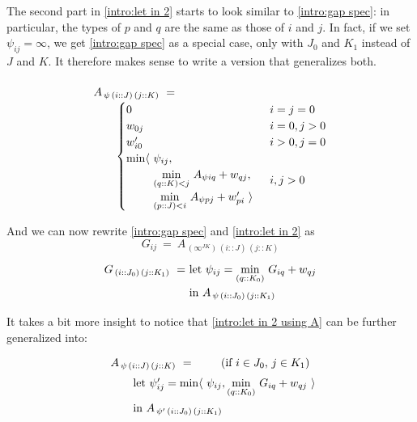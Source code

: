 \medskip
The second part in \eqref{intro:let in 2} starts to look similar to \eqref{intro:gap spec}:
in particular, the types of $p$ and $q$ are the same as those of $i$ and $j$.
In fact, if we set $\psi_{ij}=\infty$, we get \eqref{intro:gap spec} as a special case,
only with $J_0$ and $K_1$ instead of $J$ and $K$.
It therefore makes sense to write a version that generalizes both.

\begin{equation}\LeftEqNo
\renewcommand\arraystretch{1.5}
\begin{array}{l}
	A_{\,\psi\, (i :: J)\, (j :: K)} ~=~  \\
	\qquad
	\begin{cases}
		0                        & i=j=0 \\
		w_{0j}                   & i=0, j>0 \\
		w'_{i0}                  & i>0, j=0 \\
		\begin{array}{@{}l@{~}l}
		  \min\langle & \psi_{ij}, \\
		              & \underset{(q::K)<j}\min ~ A_{\psi iq} + w_{qj}, \\
		              & \underset{(p::J)<i}\min ~ A_{\psi pj} + w'_{pi}~\rangle
		\end{array}              & i,j>0
	\end{cases}
\end{array}
\label{intro:gap phase A}
\end{equation}

\medskip
And we can now rewrite \eqref{intro:gap spec} and \eqref{intro:let in 2} as
%
\begin{equation}
	G_{ij} ~=~ A_{\,(\infty^{JK})\,(i::J)\,(j::K)}
\end{equation}
%
\begin{equation}
\renewcommand\arraystretch{1.3}
\begin{array}{l@{}l}
	G_{\,(i :: J_0)\,(j :: K_1)} ~=~ 
	& \textrm{let}~\psi_{ij} = \underset{(q::K_0)}\min ~ G_{iq} + w_{qj} \\
	& \textrm{in}~A_{\,\psi\,(i::J_0)\,(j::K_1)}
\end{array}	
\label{intro:let in 2 using A}
\end{equation}

\medskip
It takes a bit more insight to notice that \eqref{intro:let in 2 using A} can be further
generalized into:
%
\begin{equation}
\renewcommand\arraystretch{1.5}
\begin{array}{l@{}l}
	A_{\,\psi\,(i :: J)\,(j :: K)} ~=~  \qquad\mbox{(if $i\in J_0$, $j\in K_1$)}\\
	\qquad
	\textrm{let}~\psi'_{ij} = \min \langle~\psi_{ij}, \underset{(q::K_0)}\min ~ G_{iq} + w_{qj}~\rangle \\
	\qquad\textrm{in}~
	A_{\,\psi'\,(i::J_0)\,(j::K_1)}
\end{array}
\label{intro:let in A}
\end{equation}


